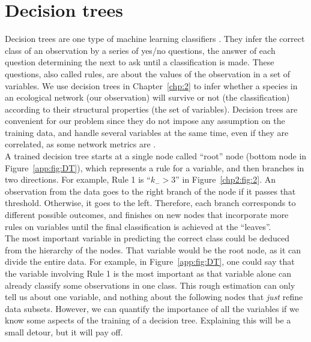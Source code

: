 \chapter{Decision trees}\label{appen:DT}
Decision trees are one type of machine learning classifiers \cite{loh2011classification}. They infer the correct class of an observation by a series of yes/no questions, the answer of each question determining the next to ask until a classification is made. These questions, also called rules, are about the values of the observation in a set of variables. We use decision trees in Chapter~\ref{chp:2} to infer whether a species in an ecological network (our observation) will survive or not (the classification) according to their structural properties (the set of variables). Decision trees are convenient for our problem since they do not impose any assumption on the training data, and handle several variables at the same time, even if they are correlated, as some network metrics are \cite{Pichler2022MachineEcologists}.  \\

A trained decision tree starts at a single node called ``root'' node (bottom node in Figure~\ref{app:fig:DT}), which represents a rule for a variable, and then branches in two directions. For example, Rule 1 is ``$k_- > 3$'' in Figure~\ref{chp2:fig:2}. An observation from the data goes to the  right branch of the node if it passes that threshold. Otherwise, it goes to the left. Therefore, each branch corresponds to different possible outcomes, and finishes on new nodes that incorporate more rules on variables until the final classification is achieved at the ``leaves''. \\

The most important variable in predicting the correct class could be deduced from the hierarchy of the nodes. That variable would be the root node, as it can divide the entire data. For example, in Figure~\ref{app:fig:DT}, one could say that the variable involving Rule 1 is the most important as that variable alone can already classify some observations in one class. This rough estimation can only tell us about one variable, and nothing about the following nodes that \textit{just} refine data subsets. However, we can quantify the importance of all the variables if we know some aspects of the training of a decision tree. Explaining this will be a small detour, but it will pay off. \\

